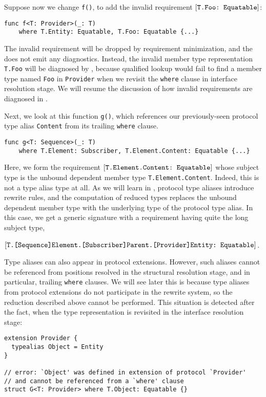 \documentclass[../generics]{subfiles}
\begin{document}
Suppose now we change \texttt{f()}, to add the invalid requirement $[\texttt{T.Foo:~Equatable}]$:
\begin{Verbatim}
func f<T: Provider>(_: T)
    where T.Entity: Equatable, T.Foo: Equatable {...}
\end{Verbatim}
The invalid requirement will be dropped by requirement minimization, and the  does not emit any diagnostics. Instead, the invalid member type representation \texttt{T.Foo} will be diagnosed by , because qualified lookup would fail to find a member type named \texttt{Foo} in \texttt{Provider} when we revisit the \texttt{where} clause in interface resolution stage.  We will resume the discussion of how invalid requirements are diagnosed in .

\smallskip

Next, we look at this function \texttt{g()}, which references our previously-seen protocol type alias \texttt{Content} from its trailing \texttt{where} clause.
\begin{Verbatim}
func g<T: Sequence>(_: T)
    where T.Element: Subscriber, T.Element.Content: Equatable {...}
\end{Verbatim}
Here, we form the requirement $[\texttt{T.Element.Content:~Equatable}]$ whose subject type is the unbound dependent member type \texttt{T.Element.Content}. Indeed, this is not a type alias type at all. As we will learn in , protocol type aliases introduce rewrite rules, and the computation of reduced types replaces the unbound dependent member type with the underlying type of the protocol type alias. In this case, we get a generic signature with a requirement having quite the long subject type,
\begin{center}
$[\texttt{T.[Sequence]Element.[Subscriber]Parent.[Provider]Entity:~Equatable}]$.
\end{center}

Type aliases can also appear in protocol extensions. However, such aliases cannot be referenced from positions resolved in the structural resolution stage, and in particular, trailing \texttt{where} clauses. We will see later this is because type aliases from protocol extensions do not participate in the rewrite system, so the reduction described above cannot be performed. This situation is detected after the fact, when the type representation is revisited in the interface resolution stage:
\begin{Verbatim}
extension Provider {
  typealias Object = Entity
}

// error: `Object' was defined in extension of protocol `Provider'
// and cannot be referenced from a `where' clause
struct G<T: Provider> where T.Object: Equatable {}
\end{Verbatim}
\end{document}
